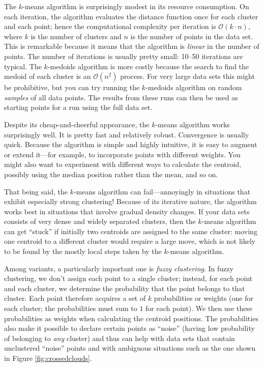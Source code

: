 The $k$-means algorithm is surprisingly modest in its resource
consumption. On each iteration, the algorithm evaluates the distance
function once for each cluster and each point; hence the computational
complexity per iteration is $\mathcal{O}(k \cdot n)$, where $k$ is the
number of clusters and $n$ is the number of points in the data set.
This is remarkable because it means that the algorithm is
\emph{linear} in the number of points. The number of iterations is
usually pretty small: 10--50 iterations are typical. The $k$-medoids
algorithm is more costly because the search to find the medoid of each
cluster is an $\mathcal{O}(n^2)$ process. For very large data sets
this might be prohibitive, but you can try running the $k$-medoids
algorithm on random \emph{samples} of all data points. The results
from these runs can then be used as starting points for a run using
the full data set.

Despite its cheap-and-cheerful appearance, the $k$-means algorithm
works surprisingly well. It is pretty fast and relatively robust.
Convergence is usually quick. Because the algorithm is simple and
highly intuitive, it is easy to augment or extend it---for example,
to incorporate points with different weights. You might also want to
experiment with different ways to calculate the centroid, possibly
using the median position rather than the mean, and so on. 

That being said, the $k$-means algorithm can fail---annoyingly in
situations that exhibit especially strong clustering!  Because of its
iterative nature, the algorithm works best in situations that involve
gradual density changes. If your data sets consists of very dense and
widely separated clusters, then the $k$-means algorithm can get
``stuck'' if initially two centroids are assigned to the same cluster:
moving one centroid to a different cluster would require a large move,
which is not likely to be found by the mostly local steps taken by the
$k$-means algorithm.

Among variants, a particularly important one is \emph{fuzzy
  clustering}.  In fuzzy clustering, we don't assign each point to a
single cluster; instead, for each point and each cluster, we determine
the probability that the point belongs to that cluster. Each point
therefore acquires a set of $k$ probabilities or weights (one for each
cluster; the probabilities must sum to $1$ for each point). We then
use these probabilities as weights when calculating the centroid
positions.  The probabilities also make it possible to declare certain
points as ``noise'' (having low probability of\vadjust{\pagebreak} belonging to \emph{any}
cluster) and thus can help with data sets that contain unclustered
``noise'' points and with ambiguous situations such as the one shown
in Figure \ref{fig:crossedclouds}.

